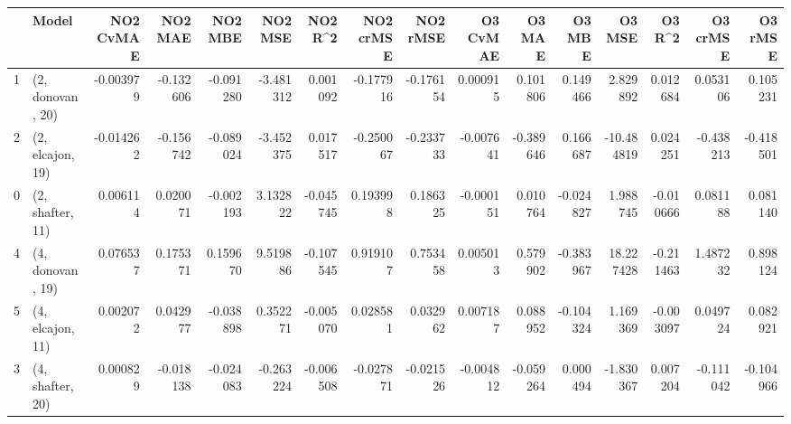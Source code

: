 \begin{tabular}{llrrrrrrrrrrrrrr}
\toprule
{} &             Model &  NO2 CvMAE &   NO2 MAE &   NO2 MBE &   NO2 MSE &   NO2 R\textasciicircum2 &  NO2 crMSE &  NO2 rMSE &  O3 CvMAE &    O3 MAE &    O3 MBE &     O3 MSE &    O3 R\textasciicircum2 &  O3 crMSE &   O3 rMSE \\
\midrule
1 &  (2, donovan, 20) &  -0.003979 & -0.132606 & -0.091280 & -3.481312 &  0.001092 &  -0.177916 & -0.176154 &  0.000915 &  0.101806 &  0.149466 &   2.829892 &  0.012684 &  0.053106 &  0.105231 \\
2 &  (2, elcajon, 19) &  -0.014262 & -0.156742 & -0.089024 & -3.452375 &  0.017517 &  -0.250067 & -0.233733 & -0.007641 & -0.389646 &  0.166687 & -10.484819 &  0.024251 & -0.438213 & -0.418501 \\
0 &  (2, shafter, 11) &   0.006114 &  0.020071 & -0.002193 &  3.132822 & -0.045745 &   0.193998 &  0.186325 & -0.000151 &  0.010764 & -0.024827 &   1.988745 & -0.010666 &  0.081188 &  0.081140 \\
4 &  (4, donovan, 19) &   0.076537 &  0.175371 &  0.159670 &  9.519886 & -0.107545 &   0.919107 &  0.753458 &  0.005013 &  0.579902 & -0.383967 &  18.227428 & -0.211463 &  1.487232 &  0.898124 \\
5 &  (4, elcajon, 11) &   0.002072 &  0.042977 & -0.038898 &  0.352271 & -0.005070 &   0.028581 &  0.032962 &  0.007187 &  0.088952 & -0.104324 &   1.169369 & -0.003097 &  0.049724 &  0.082921 \\
3 &  (4, shafter, 20) &   0.000829 & -0.018138 & -0.024083 & -0.263224 & -0.006508 &  -0.027871 & -0.021526 & -0.004812 & -0.059264 &  0.000494 &  -1.830367 &  0.007204 & -0.111042 & -0.104966 \\
\bottomrule
\end{tabular}
